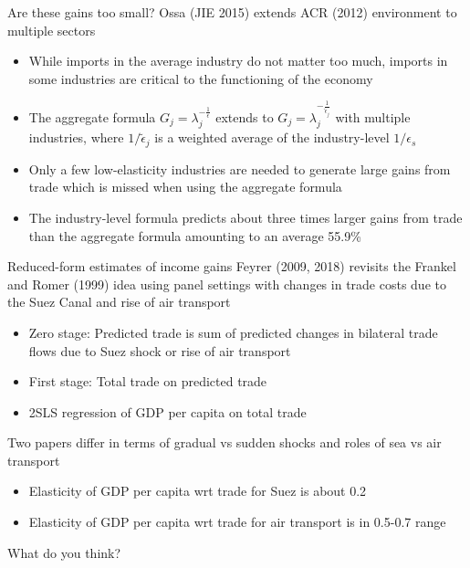 \documentclass[10pt,notes=hide]{beamer}
\begin{document}
\begin{frame}{Are these gains too small?}
Ossa (JIE 2015) extends ACR (2012) environment to multiple sectors
\begin{itemize}
\item While imports in the average industry do not matter too much, imports
in some industries are critical to the functioning of the economy
\item The aggregate formula $G_{j}=\lambda _{j}^{-\frac{1}{\epsilon }}$
extends to $G_{j}=\lambda _{j}^{-\frac{1}{\tilde{\epsilon}_{j}}}$ with
multiple industries, where $1/\tilde{\epsilon}_{j}$ is a weighted average
of the industry-level $1/\epsilon _{s}$
\item Only a few low-elasticity industries are needed to generate large
gains from trade which is missed when using the aggregate formula
\item The industry-level formula predicts about three times larger gains
from trade than the aggregate formula amounting to an average 55.9\%
\end{itemize}
\end{frame}
\begin{frame}{Reduced-form estimates of income gains}
Feyrer (2009, 2018) revisits the Frankel and Romer (1999) idea using 
panel settings with changes in trade costs due to the Suez Canal and rise of air transport
\begin{itemize}
	\item Zero stage: Predicted trade is sum of predicted changes in bilateral trade flows due to Suez shock or rise of air transport
	\item First stage: Total trade on predicted trade
	\item 2SLS regression of GDP per capita on total trade
\end{itemize}
Two papers differ in terms of gradual vs sudden shocks and roles of sea vs air transport \\
\begin{itemize}
	\item Elasticity of GDP per capita wrt trade for Suez is about 0.2
	\item Elasticity of GDP per capita wrt trade for air transport is in 0.5-0.7 range
\end{itemize}
What do you think?
\end{frame}
\end{document}

